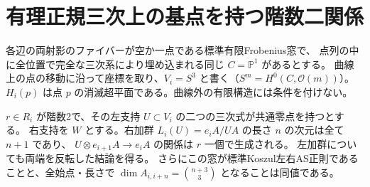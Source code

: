 \section{有理正規三次上の基点を持つ階数二関係}
\label{sec:twisted-cubic-line-modules}
各辺の両射影のファイバーが空か一点である標準有限Frobenius窓で、
点列の中に全位置で完全な三次系により埋め込まれる同じ $C=\mathbb P^1$ があるとする。
曲線上の点の移動に沿って座標を取り、$V_i=S^3$ と書く（$S^m=H^0(C,\mathcal O(m))$）。
$H_i(p)$ は点 $p$ の消滅超平面である。曲線外の有限構造には条件を付けない。
\begin{theorem}\label{thm:twisted-cubic-line-resolution}
$r\in R_i$ が階数2で、その左支持 $U\subset V_i$ の二つの三次式が共通零点を持つとする。
右支持を $W$ とする。右加群 $L_i(U)=e_i A/U A$ の長さ $n$ の次元は全て $n+1$ であり、
$U\otimes e_{i+1}A\to e_iA$ の関係は $r$ 一個で生成される。
左加群についても両端を反転した結論を得る。
さらにこの窓が標準Koszul左右AS正則であることと、全始点・長さで
$\dim A_{i,i+n}=\binom{n+3}{3}$ となることは同値である。
\end{theorem}
